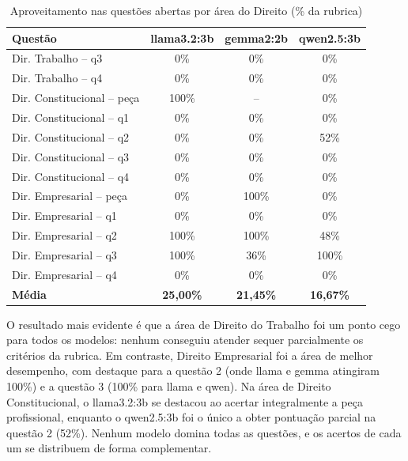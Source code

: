\documentclass[12pt,a4paper]{article}
\begin{document}
\begin{table}[H]
\centering
\caption{Aproveitamento nas questões abertas por área do Direito (\% da rubrica)}
\label{tab:ericles-rubrica}
\small
\begin{tabular}{lccc}
\toprule
\textbf{Questão} & \textbf{llama3.2:3b} & \textbf{gemma2:2b} & \textbf{qwen2.5:3b} \\
\midrule
Dir. Trabalho -- q3          & 0\%   & 0\%    & 0\%   \\
Dir. Trabalho -- q4          & 0\%   & 0\%    & 0\%   \\
Dir. Constitucional -- peça  & 100\% & --\footnotemark & 0\%   \\
Dir. Constitucional -- q1    & 0\%   & 0\%    & 0\%   \\
Dir. Constitucional -- q2    & 0\%   & 0\%    & 52\%  \\
Dir. Constitucional -- q3    & 0\%   & 0\%    & 0\%   \\
Dir. Constitucional -- q4    & 0\%   & 0\%    & 0\%   \\
Dir. Empresarial -- peça     & 0\%   & 100\%  & 0\%   \\
Dir. Empresarial -- q1       & 0\%   & 0\%    & 0\%   \\
Dir. Empresarial -- q2       & 100\% & 100\%  & 48\%  \\
Dir. Empresarial -- q3       & 100\% & 36\%   & 100\% \\
Dir. Empresarial -- q4       & 0\%   & 0\%    & 0\%   \\
\midrule
\textbf{Média}               & \textbf{25,00\%} & \textbf{21,45\%} & \textbf{16,67\%} \\
\bottomrule
\end{tabular}
\end{table}

O resultado mais evidente é que a área de Direito do Trabalho foi um ponto cego para todos os modelos: nenhum conseguiu atender sequer parcialmente os critérios da rubrica. Em contraste, Direito Empresarial foi a área de melhor desempenho, com destaque para a questão 2 (onde llama e gemma atingiram 100\%) e a questão 3 (100\% para llama e qwen). Na área de Direito Constitucional, o llama3.2:3b se destacou ao acertar integralmente a peça profissional, enquanto o qwen2.5:3b foi o único a obter pontuação parcial na questão 2 (52\%). Nenhum modelo domina todas as questões, e os acertos de cada um se distribuem de forma complementar.
\end{document}
